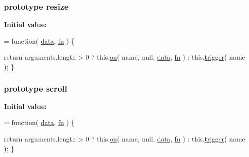 \subsubsection[{resize}]{ {\bf prototype} resize}\label{jquery-1_810_82-vsdoc_8js_a44dd45019a8a101b7494ad2d837d1bd6}
{\bfseries Initial value\+:}
\begin{DoxyCode}
= \textcolor{keyword}{function}( \hyperlink{jquery-1_810_82-vsdoc_8js_a609407b3456fdc3c5671a9fc4a226ff7}{data}, \hyperlink{jquery-1_810_82-vsdoc_8js_acef6bdaf6b9b20fdcca1ea86f0902c3b}{fn} ) \{


        \textcolor{keywordflow}{return} arguments.length > 0 ?
            this.\hyperlink{jquery-1_810_82-vsdoc_8js_ae453b412b883f60220d73468ef6c6dbc}{on}( name, null, \hyperlink{jquery-1_810_82-vsdoc_8js_a609407b3456fdc3c5671a9fc4a226ff7}{data}, \hyperlink{jquery-1_810_82-vsdoc_8js_acef6bdaf6b9b20fdcca1ea86f0902c3b}{fn} ) :
            this.\hyperlink{jquery-1_810_82-vsdoc_8js_a2388c4114d5e3e4eab020f973641519c}{trigger}( name );
    \}
\end{DoxyCode}
\hypertarget{jquery-1_810_82-vsdoc_8js_a73d4238d7a29e98ea195669790b68a9d}{}
\subsubsection[{scroll}]{ {\bf prototype} scroll}\label{jquery-1_810_82-vsdoc_8js_a73d4238d7a29e98ea195669790b68a9d}
{\bfseries Initial value\+:}
\begin{DoxyCode}
= \textcolor{keyword}{function}( \hyperlink{jquery-1_810_82-vsdoc_8js_a609407b3456fdc3c5671a9fc4a226ff7}{data}, \hyperlink{jquery-1_810_82-vsdoc_8js_acef6bdaf6b9b20fdcca1ea86f0902c3b}{fn} ) \{


        \textcolor{keywordflow}{return} arguments.length > 0 ?
            this.\hyperlink{jquery-1_810_82-vsdoc_8js_ae453b412b883f60220d73468ef6c6dbc}{on}( name, null, \hyperlink{jquery-1_810_82-vsdoc_8js_a609407b3456fdc3c5671a9fc4a226ff7}{data}, \hyperlink{jquery-1_810_82-vsdoc_8js_acef6bdaf6b9b20fdcca1ea86f0902c3b}{fn} ) :
            this.\hyperlink{jquery-1_810_82-vsdoc_8js_a2388c4114d5e3e4eab020f973641519c}{trigger}( name );
    \}
\end{DoxyCode}
\hypertarget{jquery-1_810_82-vsdoc_8js_accc573ddf4124d723e9a6da272bb24f2}{}

